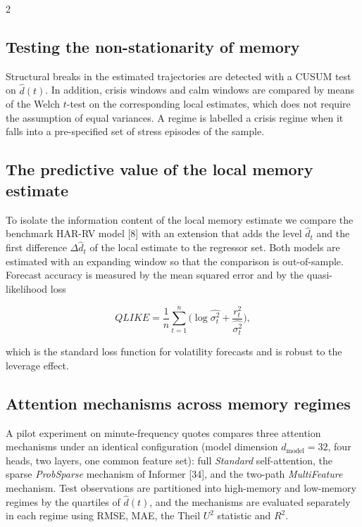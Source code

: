 \documentclass[a4paper,10pt,twoside]{article}
\begin{document}
\begin{multicols}{2}
\subsection{Testing the non-stationarity of memory}

Structural breaks in the estimated trajectories are detected with a CUSUM test on $\hat d(t)$. In
addition, crisis windows and calm windows are compared by means of the Welch $t$-test on the
corresponding local estimates, which does not require the assumption of equal variances. A regime is
labelled a crisis regime when it falls into a pre-specified set of stress episodes of the sample.

\subsection{The predictive value of the local memory estimate}

To isolate the information content of the local memory estimate we compare the benchmark HAR-RV
model [8] with an extension that adds the level $\hat d_t$ and the first
difference $\Delta\hat d_t$ of the local estimate to the regressor set. Both models are estimated
with an expanding window so that the comparison is out-of-sample. Forecast accuracy is measured by
the mean squared error and by the quasi-likelihood loss

\begin{equation}\label{eq:qlike}
QLIKE=\frac{1}{n}\sum_{t=1}^{n}\Big(\log \widehat{\sigma^2_t}+\frac{r^2_t}{\widehat{\sigma^2_t}}\Big),
\end{equation}

which is the standard loss function for volatility forecasts and is robust to the leverage effect.

\subsection{Attention mechanisms across memory regimes}

A pilot experiment on minute-frequency quotes compares three attention mechanisms under an
identical configuration (model dimension $d_{\mathrm{model}}=32$, four heads, two layers, one
common feature set): full \emph{Standard} self-attention, the sparse \emph{ProbSparse} mechanism
of Informer [34], and the two-path \emph{MultiFeature} mechanism. Test
observations are partitioned into high-memory and low-memory regimes by the quartiles of
$\hat d(t)$, and the mechanisms are evaluated separately in each regime using RMSE, MAE, the
Theil $U^2$ statistic and $R^2$.


\end{multicols}
\end{document}
